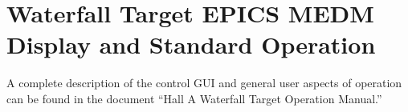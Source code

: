 \section{Waterfall Target EPICS MEDM Display and Standard Operation\label{sec: MEDM-operation}}

A complete description of the control GUI and general user aspects
of operation can be found in the document {}``Hall A Waterfall Target
Operation Manual.''






